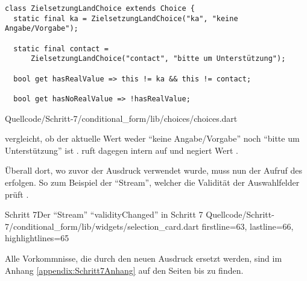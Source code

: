 \ifIncludeFigures
  \begin{listing}[htbp]
    \renewcommand\theFancyVerbLine{%
      \ifnum\value{FancyVerbLine}=187
      \setcounter{FancyVerbLine}{197}
      \tiny\ldots
      \else
      \tiny\arabic{FancyVerbLine}%
      \fi
    }
    \begin{verbatim}
class ZielsetzungLandChoice extends Choice {
  static final ka = ZielsetzungLandChoice("ka", "keine Angabe/Vorgabe");

  static final contact =
      ZielsetzungLandChoice("contact", "bitte um Unterstützung");

  bool get hasRealValue => this != ka && this != contact;

  bool get hasNoRealValue => !hasRealValue;
\end{verbatim}
     {Quellcode/Schritt-7/conditional_form/lib/choices/choices.dart}
    \label{lst:Schritt7ZielsetzungLandChoice}
  \end{listing}
\fi


 vergleicht, ob der aktuelle Wert weder \enquote{keine Angabe/Vorgabe} noch \enquote{bitte um Unterstützung} ist .
 ruft dagegen intern  auf und negiert Wert .


Überall dort, wo zuvor der Ausdruck  verwendet wurde, muss nun der Aufruf des  erfolgen.
So zum Beispiel der \enquote{Stream}, welcher die Validität der Auswahlfelder prüft \Lst{\ref{lst:Schritt7validityChangedchoiceMatcher}}.
\begin{alexlisting}{Schritt 7}{Der \enquote{Stream} \enquote{validityChanged} in Schritt 7}
  {Quellcode/Schritt-7/conditional_form/lib/widgets/selection_card.dart}
  {firstline=63, lastline=66, highlightlines={65}}
  \label{lst:Schritt7validityChangedchoiceMatcher}
  \end{alexlisting}

Alle Vorkommnisse, die durch den neuen Ausdruck ersetzt werden,
sind im Anhang \ref{appendix:Schritt7Anhang} auf den Seiten \pageref{lst:Schritt7validityChangedStreamBuilderChoiceMatcher}
bis \pageref{lst:Schritt7validateChoices} zu finden.
